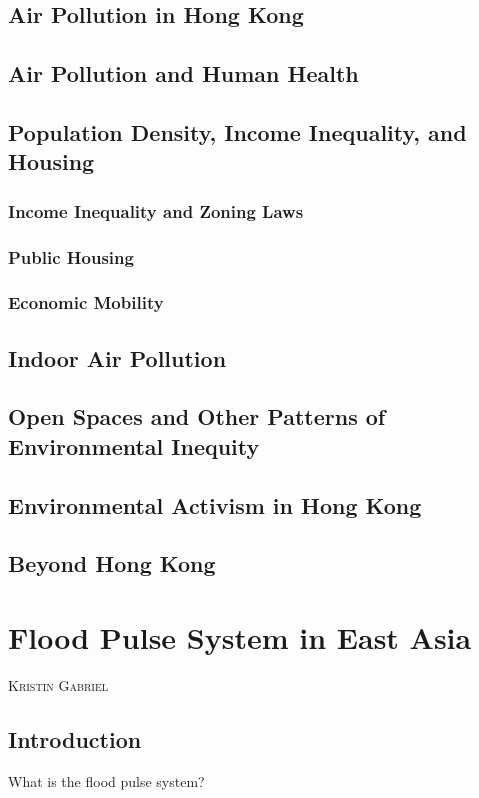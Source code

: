 \documentclass{book}\usepackage{knitr}
\makeatletter
\newcommand{\chapterauthor}[1]{%
  {\parindent0pt\vspace*{-25pt}%
  \linespread{1.1}\large\scshape#1%
  \par\nobreak\vspace*{35pt}}
  \@afterheading%
}
\makeatother
\begin{document}
\section{Air Pollution in Hong Kong}
\section{Air Pollution and Human Health}
\section{Population Density, Income Inequality, and Housing}
\subsection{Income Inequality and Zoning Laws}
\subsection{Public Housing}
\subsection{Economic Mobility}
\section{Indoor Air Pollution}
\section{Open Spaces and Other Patterns of Environmental Inequity}
\section{Environmental Activism in Hong Kong}
\section{Beyond Hong Kong}


\chapter{Flood Pulse System in East Asia}

\chapterauthor{Kristin Gabriel}

\section{Introduction}

What is the flood pulse system?
\end{document}
